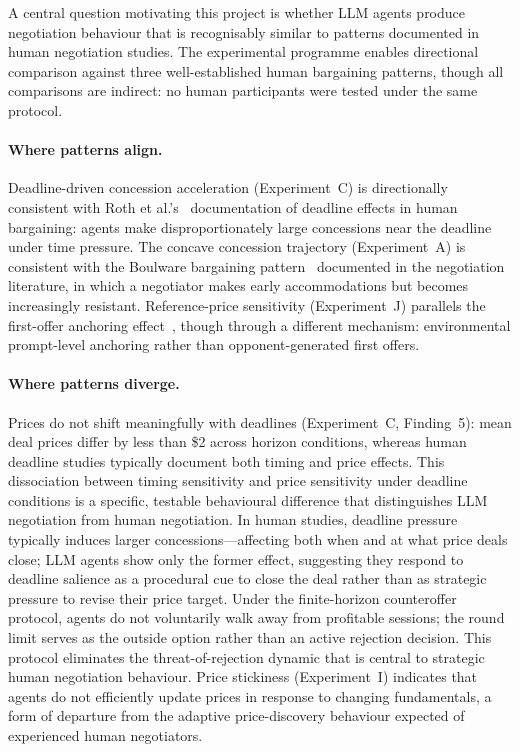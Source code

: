 A central question motivating this project is whether LLM agents produce negotiation behaviour that is recognisably similar to patterns documented in human negotiation studies.  The experimental programme enables directional comparison against three well-established human bargaining patterns, though all comparisons are indirect: no human participants were tested under the same protocol.

\paragraph{Where patterns align.}
Deadline-driven concession acceleration (Experiment~C) is directionally consistent with Roth et al.'s~\cite{roth1988deadline} documentation of deadline effects in human bargaining: agents make disproportionately large concessions near the deadline under time pressure.  The concave concession trajectory (Experiment~A) is consistent with the Boulware bargaining pattern~\cite{raiffa1982} documented in the negotiation literature, in which a negotiator makes early accommodations but becomes increasingly resistant.  Reference-price sensitivity (Experiment~J) parallels the first-offer anchoring effect~\cite{galinsky2001}, though through a different mechanism: environmental prompt-level anchoring rather than opponent-generated first offers.

\paragraph{Where patterns diverge.}
Prices do not shift meaningfully with deadlines (Experiment~C, Finding~5): mean deal prices differ by less than \$2 across horizon conditions, whereas human deadline studies typically document both timing and price effects.  This dissociation between timing sensitivity and price sensitivity under deadline conditions is a specific, testable behavioural difference that distinguishes LLM negotiation from human negotiation.  In human studies, deadline pressure typically induces larger concessions---affecting both when and at what price deals close; LLM agents show only the former effect, suggesting they respond to deadline salience as a procedural cue to close the deal rather than as strategic pressure to revise their price target.  Under the finite-horizon counteroffer protocol, agents do not voluntarily walk away from profitable sessions; the round limit serves as the outside option rather than an active rejection decision.  This protocol eliminates the threat-of-rejection dynamic that is central to strategic human negotiation behaviour.  Price stickiness (Experiment~I) indicates that agents do not efficiently update prices in response to changing fundamentals, a form of departure from the adaptive price-discovery behaviour expected of experienced human negotiators.

